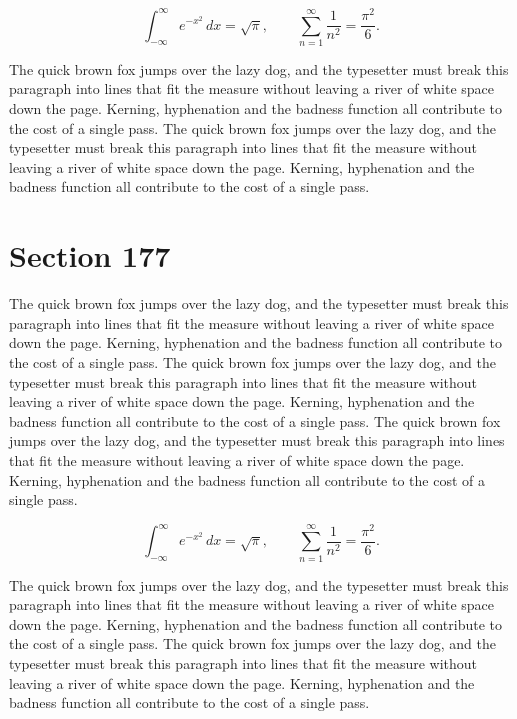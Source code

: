 \documentclass{article}
\begin{document}
\begin{equation}
\int_{-\infty}^{\infty} e^{-x^{2}}\,dx = \sqrt{\pi}, \qquad
\sum_{n=1}^{\infty} \frac{1}{n^{2}} = \frac{\pi^{2}}{6}.
\end{equation}

The quick brown fox jumps over the lazy dog, and the typesetter must break this paragraph into lines that fit the measure without leaving a river of white space down the page. Kerning, hyphenation and the badness function all contribute to the cost of a single pass. The quick brown fox jumps over the lazy dog, and the typesetter must break this paragraph into lines that fit the measure without leaving a river of white space down the page. Kerning, hyphenation and the badness function all contribute to the cost of a single pass. 
\section{Section 177}
The quick brown fox jumps over the lazy dog, and the typesetter must break this paragraph into lines that fit the measure without leaving a river of white space down the page. Kerning, hyphenation and the badness function all contribute to the cost of a single pass. The quick brown fox jumps over the lazy dog, and the typesetter must break this paragraph into lines that fit the measure without leaving a river of white space down the page. Kerning, hyphenation and the badness function all contribute to the cost of a single pass. The quick brown fox jumps over the lazy dog, and the typesetter must break this paragraph into lines that fit the measure without leaving a river of white space down the page. Kerning, hyphenation and the badness function all contribute to the cost of a single pass. 

\begin{equation}
\int_{-\infty}^{\infty} e^{-x^{2}}\,dx = \sqrt{\pi}, \qquad
\sum_{n=1}^{\infty} \frac{1}{n^{2}} = \frac{\pi^{2}}{6}.
\end{equation}

The quick brown fox jumps over the lazy dog, and the typesetter must break this paragraph into lines that fit the measure without leaving a river of white space down the page. Kerning, hyphenation and the badness function all contribute to the cost of a single pass. The quick brown fox jumps over the lazy dog, and the typesetter must break this paragraph into lines that fit the measure without leaving a river of white space down the page. Kerning, hyphenation and the badness function all contribute to the cost of a single pass. 
\end{document}

